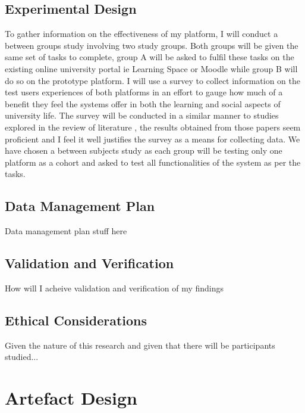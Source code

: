 \documentclass[lettersize,journal]{IEEEtran}
\begin{document}
    	\subsection{Experimental Design}
    	To gather information on the effectiveness of my platform, I will conduct a between groups study involving
    	two study groups. Both groups will be given the same set of tasks to complete, group A will be asked to fulfil 
    	these tasks on the existing online university portal ie Learning Space or Moodle while group B will
	do so on the prototype platform. I will use a survey to collect information on the test users experiences
    	of both platforms in an effort to gauge how much of a benefit they feel the systems offer in both the
    	learning and social aspects of university life. The survey will be conducted in a similar manner to
	studies explored in the review of literature \cite{Liu2010}\cite{Baruah2012}\cite{Wang2011}\cite{Evans2014}\cite{Akram et al 2017},
	the results obtained from those papers seem proficient and I feel it well justifies the survey as a means for collecting data.
	We have chosen a between subjects study	as each group will be testing only one platform as a cohort and asked to test all functionalities of
    	the system as per the tasks.

	\subsection{Data Management Plan}
	Data management plan stuff here

	\subsection{Validation and Verification}
	How will I acheive validation and verification of my findings

	\subsection{Ethical Considerations}
	Given the nature of this research and given that there will be participants studied...

\section{Artefact Design}
\end{document}
